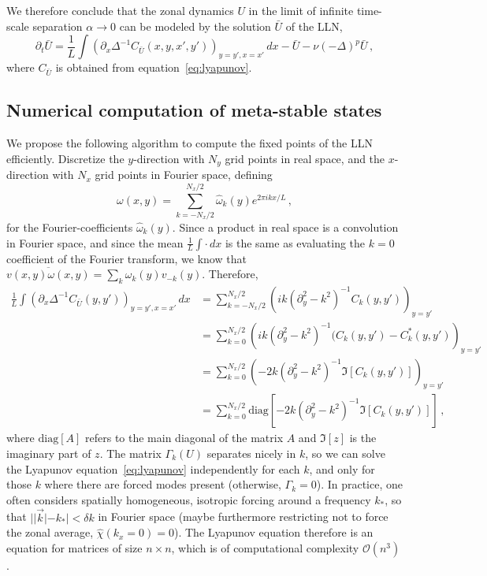 \documentclass[12pt]{amsart}
\begin{document}
We therefore conclude that the zonal dynamics $U$ in the limit of
infinite time-scale separation $\alpha\to0$ can be modeled by the
solution $\bar U$ of the LLN,
\begin{equation}
  \partial_t \bar U = \frac1L\int \left(\partial_x \Delta^{-1} C_{\bar U}(x,y,x',y')\right)_{y=y',x=x'} \,dx - \bar U - \nu (-\Delta)^p \bar U\,,
\end{equation}
where $C_{\bar U}$ is obtained from equation~\eqref{eq:lyapunov}. 

\subsection{Numerical computation of meta-stable states}

We propose the following algorithm to compute the fixed points of the
LLN efficiently. Discretize the $y$-direction with $N_y$ grid points
in real space, and the $x$-direction with $N_x$ grid points in Fourier
space, defining 
\begin{equation*}
  \omega(x,y) = \sum_{k=-N_x/2}^{N_x/2} \hat\omega_k(y) e^{2\pi i k x/L}\,,
\end{equation*}
for the Fourier-coefficients $\hat\omega_k(y)$. Since a product in
real space is a convolution in Fourier space, and since the mean
$\frac1L\int\cdot\,dx$ is the same as evaluating the $k=0$ coefficient
of the Fourier transform, we know that
$\overline{v(x,y)\omega(x,y)}=\sum_k \omega_k(y) v_{-k}(y)$. Therefore,
\begin{equation*}
  \begin{aligned}
    \frac1L\int \left(\partial_x \Delta^{-1} C_{\bar U}(y,y')\right)_{y=y',x=x'} \,dx &= \sum_{k=-N_x/2}^{N_x/2} \left( ik(\partial_y^2-k^2)^{-1} C_k(y,y')\right)_{y=y'}\\
    &= \sum_{k=0}^{N_x/2}\left( ik(\partial_y^2-k^2)^{-1} (C_k(y,y')-C_k^*(y,y')\right)_{y=y'}\\
    &= \sum_{k=0}^{N_x/2}\left( -2k(\partial_y^2-k^2)^{-1} \Im \left[C_k(y,y')\right]\right)_{y=y'}\\
    &= \sum_{k=0}^{N_x/2}\mathrm{diag}\left[ -2k(\partial_y^2-k^2)^{-1} \Im \left[C_k(y,y')\right]\right]\,,
  \end{aligned}
\end{equation*}
where $\mathrm{diag}[A]$ refers to the main diagonal of the matrix $A$
and $\Im[z]$ is the imaginary part of $z$. The matrix $\Gamma_k(U)$
separates nicely in $k$, so we can solve the Lyapunov
equation~\eqref{eq:lyapunov} independently for each $k$, and only for
those $k$ where there are forced modes present (otherwise,
$\Gamma_k=0$). In practice, one often considers spatially
homogeneous, isotropic forcing around a frequency $k_*$, so that
$||\vec k|-k_*|<\delta k$ in Fourier space (maybe furthermore restricting not
to force the zonal average, $\hat\chi(k_x=0)=0$).  The Lyapunov equation
therefore is an equation for matrices of size $n\times n$, which is of
computational complexity $\mathcal{O}(n^3)$
\cite{bartels-stewart:1972}.
\end{document}
